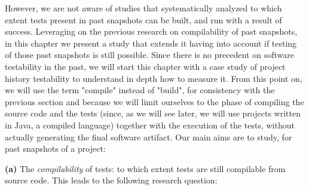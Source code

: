 

However, we are not aware of studies that systematically analyzed to which extent tests present in past snapshots can be built, and run with a result of success. Leveraging on the previous research on compilability of past snapshots, in this chapter we present a study that extends it having into account if testing of those past snapshots is still possible. 
Since there is no precedent on software testability in the past, we will start this chapter with a case study of project history testability to understand in depth how to measure it.
From this point on, we will use the term "compile" instead of "build", for consistency with the previous section and because we will limit ourselves to the phase of compiling the source code and the tests (since, as we will see later, we will use projects written in Java, a compiled language) together with the execution of the tests, without actually generating the final software artifact.
Our main aims are to study, for past snapshots of a project:


\textbf{(a)} The \textit{compilability} of tests: to which extent tests are still compilable from source code. 
This leads to the following research question:

\def \RQI{On how many snapshots of the change history can we compile tests?}

